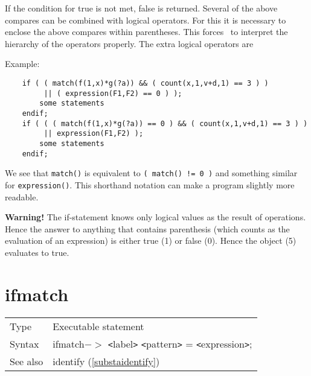 \leftvitem{2cm}{$<=$}
 
\leftvitem{2cm}{$!=$}

If the condition for true is not met, false is returned. Several of the 
above compares can be combined with logical operators. For this it is 
necessary to enclose the above compares within parentheses. This forces 
\FORM\ to interpret the hierarchy of the operators 
properly. The extra logical operators are
 
\leftvitem{2cm}{$||$}
 
\leftvitem{2cm}{$\&\&$}

\noindent Example:
\begin{verbatim}
    if ( ( match(f(1,x)*g(?a)) && ( count(x,1,v+d,1) == 3 ) )
         || ( expression(F1,F2) == 0 ) );
        some statements
    endif;
    if ( ( ( match(f(1,x)*g(?a)) == 0 ) && ( count(x,1,v+d,1) == 3 ) )
         || expression(F1,F2) );
        some statements
    endif;
\end{verbatim}
We see that \verb:match(): is equivalent to \verb:( match() != 0 ): and 
something similar for \verb:expression():. This shorthand 
notation can make a program slightly more readable.

{\bf Warning! } The if-statement knows only logical values as the result of 
operations. Hence the answer to anything that contains parenthesis (which 
counts as the evaluation of an expression) is either true (1) or false (0). 
Hence the object (5) evaluates to true. \vspace{10mm}


\section{ifmatch}
\label{substaifmatch}

\noindent \begin{tabular}{ll}
Type & Executable statement\\
Syntax & ifmatch$-\!\!>$ {\tt<}label{\tt>} {\tt<}pattern{\tt>} = {\tt<}expression{\tt>};
\\ See also & identify (\ref{substaidentify})
\end{tabular} \vspace{4mm}

